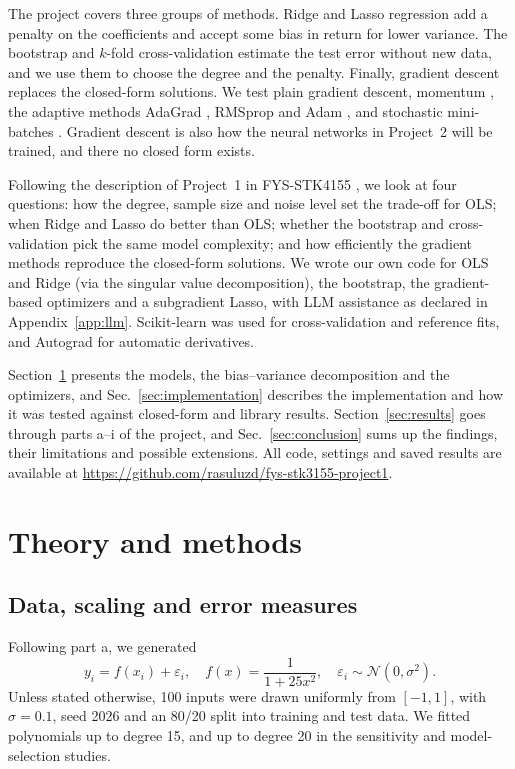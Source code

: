 \documentclass[aps,prb,reprint,superscriptaddress,nofootinbib,longbibliography,floatfix]{revtex4-2}
\begin{document}
The project covers three groups of methods. Ridge \cite{Hoerl1970} and Lasso \cite{Tibshirani1996} regression add a penalty on the coefficients and accept some bias in return for lower variance. The bootstrap \cite{Efron1979} and $k$-fold cross-validation \cite{Hastie2009} estimate the test error without new data, and we use them to choose the degree and the penalty. Finally, gradient descent replaces the closed-form solutions. We test plain gradient descent, momentum \cite{Polyak1964}, the adaptive methods AdaGrad \cite{Duchi2011}, RMSprop \cite{Tieleman2012} and Adam \cite{Kingma2015}, and stochastic mini-batches \cite{Robbins1951}. Gradient descent is also how the neural networks in Project~2 will be trained, and there no closed form exists.

Following the description of Project~1 in FYS-STK4155 \cite{Project1_2026}, we look at four questions: how the degree, sample size and noise level set the trade-off for OLS; when Ridge and Lasso do better than OLS; whether the bootstrap and cross-validation pick the same model complexity; and how efficiently the gradient methods reproduce the closed-form solutions. We wrote our own code for OLS and Ridge (via the singular value decomposition), the bootstrap, the gradient-based optimizers and a subgradient Lasso, with LLM assistance as declared in Appendix~\ref{app:llm}. Scikit-learn \cite{Pedregosa2011} was used for cross-validation and reference fits, and Autograd \cite{Maclaurin2015} for automatic derivatives.

Section~\ref{sec:theory} presents the models, the bias--variance decomposition and the optimizers, and Sec.~\ref{sec:implementation} describes the implementation and how it was tested against closed-form and library results. Section~\ref{sec:results} goes through parts a--i of the project, and Sec.~\ref{sec:conclusion} sums up the findings, their limitations and possible extensions. All code, settings and saved results are available at \url{https://github.com/rasuluzd/fys-stk3155-project1}.

\section{Theory and methods}\label{sec:theory}

\subsection{Data, scaling and error measures}\label{sec:data}\label{sec:scaling}
Following part a, we generated
\begin{equation}
y_i=f(x_i)+\varepsilon_i,\quad f(x)=\frac{1}{1+25x^2},\quad
\varepsilon_i\sim\mathcal N(0,\sigma^2).
\end{equation}
Unless stated otherwise, 100 inputs were drawn uniformly from $[-1,1]$, with $\sigma=0.1$, seed 2026 and an 80/20 split into training and test data. We fitted polynomials up to degree 15, and up to degree 20 in the sensitivity and model-selection studies.
\end{document}
